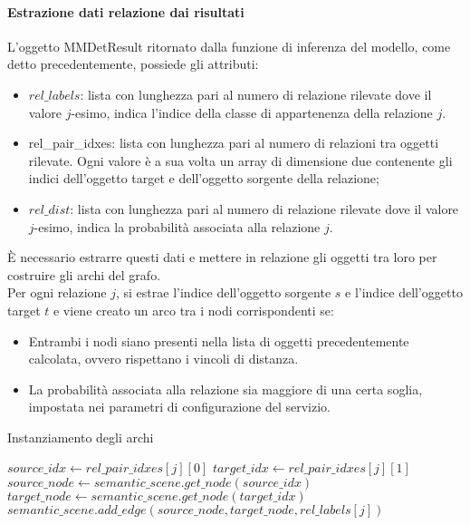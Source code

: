 \paragraph{Estrazione dati relazione dai risultati}
L'oggetto MMDetResult ritornato dalla funzione di inferenza del modello, come detto precedentemente, possiede gli attributi:
\begin{itemize}
	\item $rel\_labels$: lista con lunghezza pari al numero di relazione rilevate dove il valore $j$-esimo, indica l'indice della classe di appartenenza della relazione $j$.
	\item rel\_pair\_idxes: lista con lunghezza pari al numero di relazioni tra oggetti rilevate. Ogni valore è a sua volta un array di dimensione due contenente gli indici dell'oggetto target e dell'oggetto sorgente della relazione;
	\item $rel\_dist$: lista con lunghezza pari al numero di relazione rilevate dove il valore $j$-esimo, indica la probabilità associata alla relazione $j$.
\end{itemize}
È necessario estrarre questi dati e mettere in relazione gli oggetti tra loro per costruire gli archi del grafo.\\
Per ogni relazione $j$, si estrae l'indice dell'oggetto sorgente $s$ e l'indice dell'oggetto target $t$ e viene creato un arco tra i nodi corrispondenti se:
\begin{itemize}
	\item Entrambi i nodi siano presenti nella lista di oggetti precedentemente calcolata, ovvero rispettano i vincoli di distanza.
	\item La probabilità associata alla relazione sia maggiore di una certa soglia, impostata nei parametri di configurazione del servizio.
\end{itemize}

\begin{algorithm}
	\caption{Instanziamento degli archi}
	\begin{algorithmic}[1]
		\State $source\_idx \gets rel\_pair\_idxes[j][0]$
		\State $target\_idx \gets rel\_pair\_idxes[j][1]$
		\State $source\_node \gets semantic\_scene.get\_node(source\_idx)$
		\State $target\_node \gets semantic\_scene.get\_node(target\_idx)$
		\State $semantic\_scene.add\_edge(source\_node, target\_node, rel\_labels[j])$
		\EndIf
		\EndIf
		\EndFor
	\end{algorithmic}
\end{algorithm}



